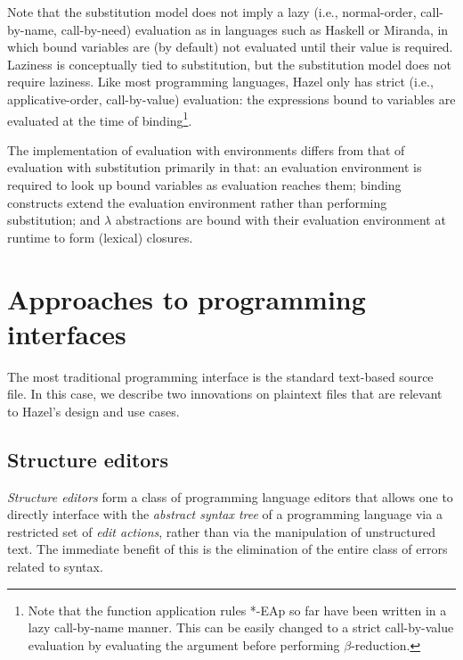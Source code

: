 Note that the substitution model does not imply a lazy (i.e., normal-order, call-by-name, call-by-need) evaluation \cite{plotkin1975call} as in languages such as Haskell or Miranda, in which bound variables are (by default) not evaluated until their value is required. Laziness is conceptually tied to substitution, but the substitution model does not require laziness. Like most programming languages, Hazel only has strict (i.e., applicative-order, call-by-value) evaluation: the expressions bound to variables are evaluated at the time of binding\footnote{Note that the function application rules *-EAp so far have been written in a lazy call-by-name manner. This can be easily changed to a strict call-by-value evaluation by evaluating the argument before performing $\beta$-reduction.}.


The implementation of evaluation with environments differs from that of evaluation with substitution primarily in that: an evaluation environment is required to look up bound variables as evaluation reaches them; binding constructs extend the evaluation environment rather than performing substitution; and $\lambda$ abstractions are bound with their evaluation environment at runtime to form (lexical) closures.

\section{Approaches to programming interfaces}
\label{sec:prog-intf}

The most traditional programming interface is the standard text-based source file. In this case, we describe two innovations on plaintext files that are relevant to Hazel's design and use cases.

\subsection{Structure editors}
\label{sec:structure-editors}

\textit{Structure editors} form a class of programming language editors that allows one to directly interface with the \textit{abstract syntax tree} of a programming language via a restricted set of \textit{edit actions}, rather than via the manipulation of unstructured text. The immediate benefit of this is the elimination of the entire class of errors related to syntax.

